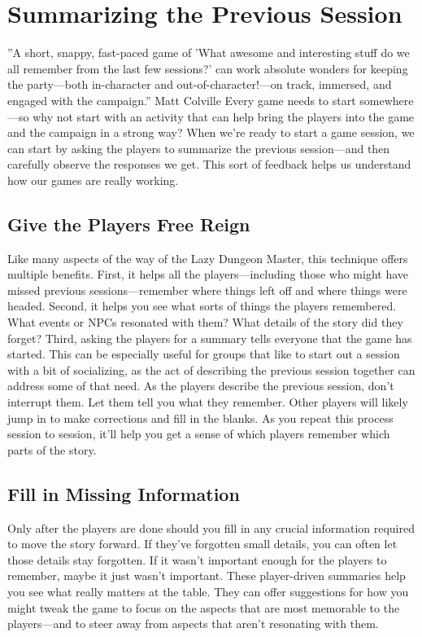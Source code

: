 \documentclass[10pt,a4paper,twoside,bg=print,twocolumn,openany,nodeprecatedcode]{dndbook}
\begin{document}
\section{Summarizing the Previous Session}
\DndQuote%
{}
{''A short, snappy, fast-paced game of 'What awesome and interesting stuff do we all remember from the last few sessions?' can work absolute wonders for keeping the party—both in-character and out-of-character!—on track, immersed, and engaged with the campaign.''}
{Matt Colville}
Every game needs to start somewhere—so why not start with an activity that can help bring the players into the game and the campaign in a strong way?
When we're ready to start a game session, we can start by asking the players to summarize the previous session—and then carefully observe the responses we get. This sort of feedback helps us understand how our games are really working.
\subsection{Give the Players Free Reign}
Like many aspects of the way of the Lazy Dungeon Master, this technique offers multiple benefits.
First, it helps all the players—including those who might have missed previous sessions—remember where things left off and where things were headed.
Second, it helps you see what sorts of things the players remembered. What events or NPCs resonated with them? What details of the story did they forget?
Third, asking the players for a summary tells everyone that the game has started. This can be especially useful for groups that like to start out a session with a bit of socializing, as the act of describing the previous session together can address some of that need.
As the players describe the previous session, don't interrupt them. Let them tell you what they remember. Other players will likely jump in to make corrections and fill in the blanks. As you repeat this process session to session, it'll help you get a sense of which players remember which parts of the story.
\subsection{Fill in Missing Information}
Only after the players are done should you fill in any crucial information required to move the story forward. If they've forgotten small details, you can often let those details stay forgotten. If it wasn't important enough for the players to remember, maybe it just wasn't important.
These player-driven summaries help you see what really matters at the table. They can offer suggestions for how you might tweak the game to focus on the aspects that are most memorable to the players—and to steer away from aspects that aren't resonating with them.
\end{document}

